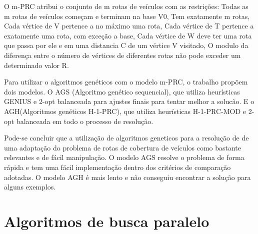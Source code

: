 O m-PRC atribui o conjunto de m rotas de veículos com as restrições: Todas as m rotas de veículos começam e terminam na base V0, Tem exatamente m rotas, Cada vértice de V pertence a no máximo uma rota, Cada vértice de T pertence a exatamente uma rota, com exceção a base, Cada vértice de W deve ter uma rota que passa por ele e em uma distancia C de um vértice V visitado, O modulo da diferença entre o número de vértices de diferentes rotas não pode exceder um determinado valor R.

\begin{minipage}{\linewidth}
\end{minipage}

Para utilizar o algoritmos genéticos com o modelo m-PRC, o trabalho propõem dois modelos. O AGS (Algoritmo genético sequencial), que utiliza heurísticas GENIUS e 2-opt balanceada para ajustes finais para tentar melhor a solucão. E o AGH(Algoritmos genéticos H-1-PRC), que utiliza heurísticas H-1-PRC-MOD e 2-opt balanceada em todo o processo de resolução.

Pode-se concluir que a utilização de algoritmos geneticos para a resolução de de uma adaptação do problema de rotas de cobertura de veículos como bastante relevantes e de fácil manipulação. O modelo AGS resolve o problema de forma rápida e tem uma fácil implementação dentro dos critérios de comparação adotadas. O modelo AGH é mais lento e não conseguiu encontrar a solução para alguns exemplos.

\section{Algoritmos de busca paralelo}

